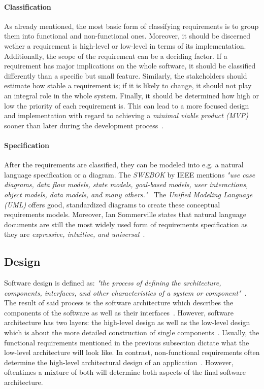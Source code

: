 \documentclass[12pt,a4paper]{report}
\begin{document}
\paragraph{Classification}
As already mentioned, the most basic form of classifying requirements is to group
them into functional and non-functional ones. Moreover, it should be discerned
wether a requirement is high-level or low-level in terms of its implementation.
Additionally, the scope of the requirement can be a deciding factor.
If a requirement has major implications on the whole software, it should be classified
differently than a specific but small feature. Similarly, the stakeholders should
estimate how stable a requirement is; if it is likely to change, it should not
play an integral role in the whole system.
Finally, it should be determined how high or low the priority of each requirement is.
This can lead to a more focused design and implementation with regard to achieving
a \textit{minimal viable product (MVP)} sooner than later during
the development process~\cite{swebok, sommerville-se}.

\paragraph{Specification}
After the requirements are classified, they can be modeled into e.g.
a natural language specification or a diagram.
The \textit{SWEBOK} by IEEE mentions \textit{"use case diagrams, data flow models,
state models, goal-based models, user interactions,
object models, data models, and many others."}~\cite{swebok}
The \textit{Unified Modeling Language (UML)} offers good, standardized diagrams
to create these conceptual requirements models.
Moreover, Ian Sommerville states that natural language documents
are still the most widely used form of requirements specification as they are
\textit{expressive, intuitive, and universal}~\cite{sommerville-se}.


\subsection{Design} \label{subsect:design}

Software design is defined as: \textit{"the process of defining
the architecture, components, interfaces, and other characteristics
of a system or component"}~\cite{iso-se}.
The result of said process is the software architecture which describes the
components of the software as well as their interfaces~\cite{swebok}.
However, software architecture has two layers: the high-level design as well as
the low-level design which is about the more detailed
construction of single components~\cite{iso-sdlc}.
Usually, the functional requirements mentioned in the previous subsection dictate
what the low-level architecture will look like. In contrast, non-functional
requirements often determine the high-level architectural design of an application~\cite{bosch-sa}.
However, oftentimes a mixture of both will determine both aspects of the final software architecture.
\end{document}
